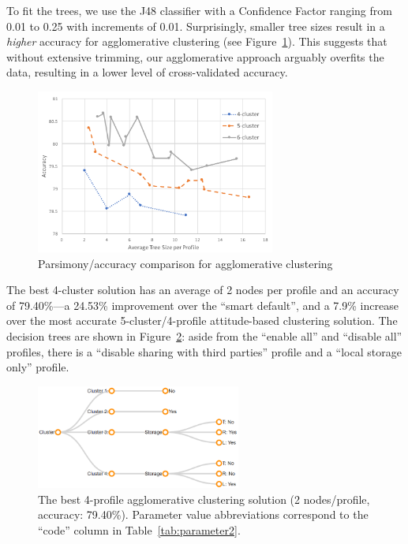 To fit the trees, we use the J48 classifier with a Confidence Factor ranging from 0.01 to 0.25 with increments of 0.01. Surprisingly, smaller tree sizes result in a \emph{higher} accuracy for agglomerative clustering (see Figure~\ref{fig:conglosum}). This suggests that without extensive trimming, our agglomerative approach arguably overfits the data, resulting in a lower level of cross-validated accuracy.

\begin{figure}
	\centering
	\includegraphics[width=0.7\textwidth]{figures/congloSum2.pdf}
	\caption{Parsimony/accuracy comparison for agglomerative clustering}
	\label{fig:conglosum}
\end{figure}

The best 4-cluster solution has an average of 2 nodes per profile and an accuracy of 79.40\%---a 24.53\% improvement over the ``smart default'', and a 7.9\% increase over the most accurate 5-cluster/4-profile attitude-based clustering solution. The decision trees are shown in Figure~\ref{fig:conglo_4_profile001}: aside from the ``enable all'' and ``disable all'' profiles, there  is a ``disable sharing with third parties'' profile and a ``local storage only'' profile.

\begin{figure}
	\centering
	\includegraphics[width=0.6\textwidth]{figures/conglo_4_profile001.png}
	\caption{The best 4-profile agglomerative clustering solution (2 nodes/profile, accuracy: 79.40\%). Parameter value abbreviations correspond to the ``code'' column in Table~\ref{tab:parameter2}.}
	\label{fig:conglo_4_profile001}
\end{figure}


